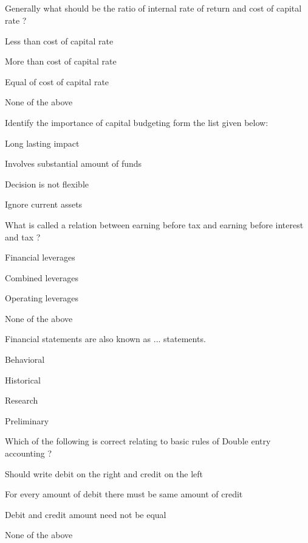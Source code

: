 \subsection*{}
\begin{questions}

\question Generally what should be the ratio of internal rate of return and cost of capital rate ?
  \begin{items}
  \item Less than cost of capital rate
  \item More than cost of capital rate
  \item Equal of cost of capital rate
  \item None of the above
  \end{items}

\question Identify the importance of capital budgeting form the list given below:
  \begin{items}
  \item Long lasting impact
  \item Involves substantial amount of funds
  \item Decision is not flexible
  \item Ignore current assets
  \end{items}

\question What is called a relation between earning before tax and earning before interest and tax ?
  \begin{items}
  \item Financial leverages
  \item Combined leverages
  \item Operating leverages
  \item None of the above
  \end{items}

\question Financial statements are also known as ... statements.
  \begin{items}
  \item Behavioral
  \item Historical
  \item Research
  \item Preliminary
  \end{items}

\question Which of the following is correct relating to basic rules of Double entry accounting ?
  \begin{items}
  \item Should write debit on the right and credit on the left
  \item For every amount of debit there must be same amount of credit
  \item Debit and credit amount need not be equal
  \item None of the above
  \end{items}


\end{questions}
